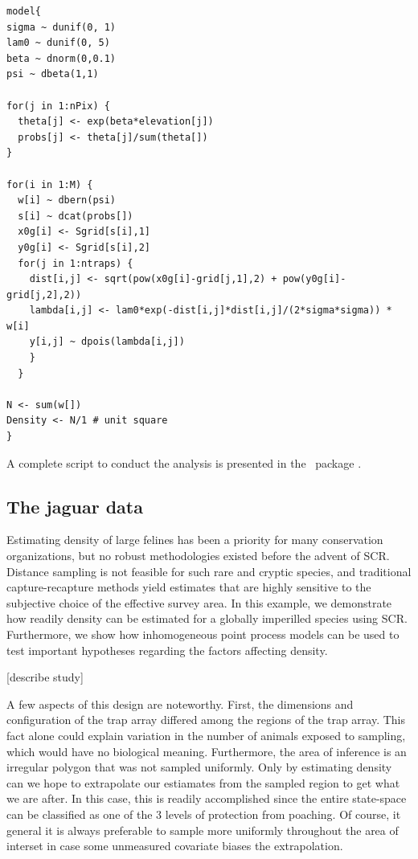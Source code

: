 \begin{verbatim}
model{
sigma ~ dunif(0, 1)
lam0 ~ dunif(0, 5)
beta ~ dnorm(0,0.1)
psi ~ dbeta(1,1)

for(j in 1:nPix) {
  theta[j] <- exp(beta*elevation[j])
  probs[j] <- theta[j]/sum(theta[])
}

for(i in 1:M) {
  w[i] ~ dbern(psi)
  s[i] ~ dcat(probs[])
  x0g[i] <- Sgrid[s[i],1]
  y0g[i] <- Sgrid[s[i],2]
  for(j in 1:ntraps) {
    dist[i,j] <- sqrt(pow(x0g[i]-grid[j,1],2) + pow(y0g[i]-grid[j,2],2))
    lambda[i,j] <- lam0*exp(-dist[i,j]*dist[i,j]/(2*sigma*sigma)) * w[i]
    y[i,j] ~ dpois(lambda[i,j])
    }
  }

N <- sum(w[])
Density <- N/1 # unit square
}
\end{verbatim}

A complete script to conduct the analysis is presented in the
\R~package
.



\subsection{The jaguar data}

Estimating density of large felines has been a priority for many
conservation organizations, but no robust methodologies existed before
the advent of SCR. Distance sampling is not feasible for such rare and
cryptic species, and traditional capture-recapture methods yield
estimates that are highly sensitive to the subjective choice of the
effective survey area. In this example, we
demonstrate how readily density can be estimated for a
globally imperilled species using SCR. Furthermore, we show how
inhomogeneous point process models can be used to test important
hypotheses regarding the factors affecting density.

[describe study]

A few aspects of this design are noteworthy. First, the dimensions and
configuration of the trap array differed among the regions of the trap
array. This fact alone could explain variation in the number of
animals exposed to sampling, which would have no biological
meaning. Furthermore, the area of inference is an irregular polygon
that was not sampled uniformly. Only by estimating density can we hope
to extrapolate our estiamates from the sampled region to get what we
are after. In this case, this is readily accomplished since the entire
state-space can be classified as one of the 3 levels of protection
from poaching. Of course, it general it is always preferable to sample
more uniformly throughout the area of interset in case some unmeasured
covariate biases the extrapolation.


